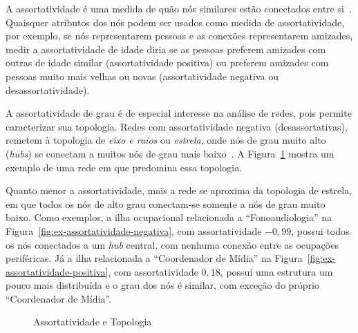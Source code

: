 \documentclass[12pt,a4paper]{article}
\begin{document}
A assortatividade é uma medida de quão nós similares estão conectados entre si~\cite{Newman2003-jn}. Quaisquer atributos dos nós podem ser usados como medida de assortatividade, por exemplo, se nós representarem pessoas e as conexões representarem amizades, medir a assortatividade de idade diria se as pessoas preferem amizades com outras de idade similar (assortatividade positiva) ou preferem amizades com pessoas muito mais velhas ou novas (assortatividade negativa ou desassortatividade).

A assortatividade de grau é de especial interesse na análise de redes, pois permite caracterizar sua topologia. Redes com assortatividade negativa (desassortativas), remetem à topologia de \textit{eixo e raios} ou \textit{estrela}, onde nós de grau muito alto (\textit{hubs}) se conectam a muitos nós de grau mais baixo~\cite{Barabasi2016-rn}. A Figura~\ref{fig:assortatividade-topologia} mostra um exemplo de uma rede em que predomina essa topologia.

Quanto menor a assortatividade, mais a rede se aproxima da topologia de estrela, em que todos os nós de alto grau conectam-se somente a nós de grau muito baixo. Como exemplos, a ilha ocupacional relacionada a \enquote{Fonoaudiologia} na Figura~\ref{fig:ex-assortatividade-negativa}, com assortatividade $-0,99$, possui todos os nós conectados a um \textit{hub} central, com nenhuma conexão entre as ocupações periféricas. Já a ilha relacionada a \enquote{Coordenador de Mídia} na Figura~\ref{fig:ex-assortatividade-positiva}, com assortatividade $0,18$, possui uma estrutura um pouco mais distribuída e o grau dos nós é similar, com exceção do próprio \enquote{Coordenador de Mídia}.

\begin{figure}[ht]
    \centering
    \caption{Assortatividade e Topologia}
    \label{fig:assortatividade-topologia}
\end{figure}
\end{document}
